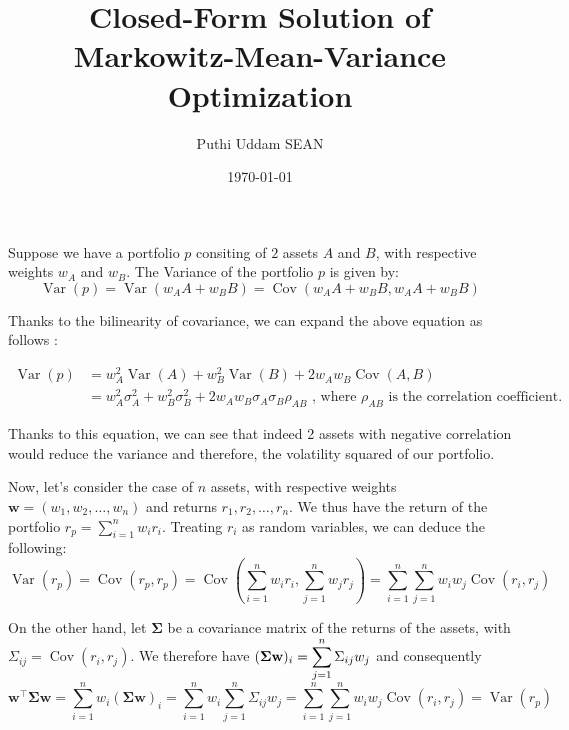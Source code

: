\documentclass{article}
\title{Closed-Form Solution of Markowitz-Mean-Variance Optimization}
\author{Puthi Uddam SEAN}
\date{\today}
\DeclareMathOperator{\Var}{Var}
\DeclareMathOperator{\Cov}{Cov}
\newcommand{\bw}{\mathbf{w}}
\newcommand{\bSigma}{\boldsymbol{\Sigma}}
\begin{document}
\maketitle{}

Suppose we have a portfolio ${p}$ consiting of ${2}$ assets ${A}$ and ${B}$, with respective weights ${w_A}$ and ${w_B}$.
The Variance of the portfolio ${p}$ is given by:
\begin{equation}
    \Var(p) = \Var(w_A A + w_B B) = \Cov(w_A A + w_B B, w_A A + w_B B)
\end{equation} 

Thanks to the bilinearity of covariance, we can expand the above equation as follows :

\begin{equation}
    \begin{aligned}
        \Var(p) &= w_A^2 \Var(A) + w_B^2 \Var(B) + 2 w_A w_B \Cov(A, B) \\ 
        &= w_A^2 \sigma^2_A + w_B^2 \sigma^2_B + 2 w_A w_B \sigma_A \sigma_B \rho_{AB} \text{ , where } \rho_{AB} \text{ is the correlation coefficient.}
    \end{aligned}
\end{equation}

Thanks to this equation, we can see that indeed 2 assets with negative correlation would reduce the variance and therefore, the volatility squared of our portfolio.

\vspace{1em}

Now, let's consider the case of ${n}$ assets, with respective weights ${\bw = (w_1, w_2, \ldots, w_n)}$ and returns ${r_1, r_2, \ldots, r_n}$. We thus have the return of the portfolio ${r_p = \sum_{i=1}^{n} w_i r_i}$. Treating ${r_i}$ as random variables, we can deduce the following:
\begin{equation}
    \Var(r_p) = \Cov(r_p, r_p) = \Cov\left(\sum_{i=1}^{n} w_i r_i, \sum_{j=1}^{n} w_j r_j\right) = \sum_{i=1}^{n} \sum_{j=1}^{n} w_i w_j \Cov(r_i, r_j)
\end{equation}

On the other hand, let $\bSigma$ be a covariance matrix of the returns of the assets, with $\Sigma_{ij} = \Cov(r_i, r_j)$. We therefore have $(\bSigma \bw)_i = \mathlarger{\sum_{j=1}^n \Sigma_{ij} w_j}$ and consequently 
\begin{equation}
\bw^\top \bSigma \bw = \sum_{i=1}^{n} w_i (\bSigma \bw)_i = \sum_{i=1}^{n} w_i \sum_{j=1}^{n} \Sigma_{ij} w_j = \sum_{i=1}^{n} \sum_{j=1}^{n} w_i w_j \Cov(r_i, r_j) = \Var(r_p)
\end{equation}
\end{document}
